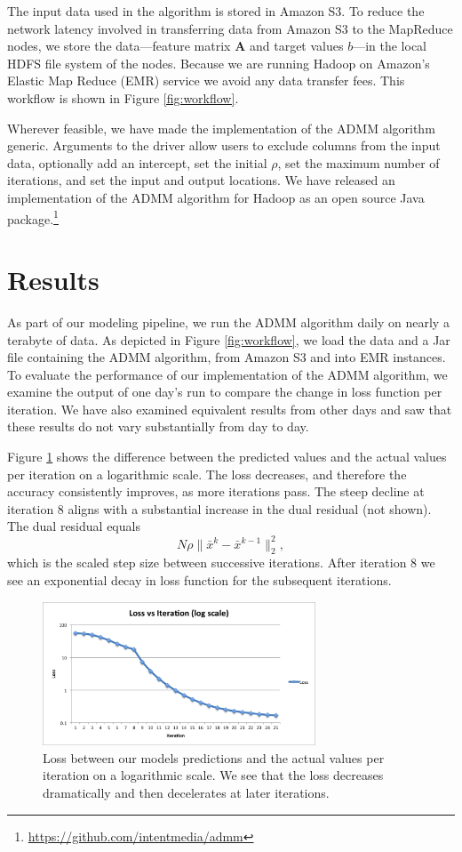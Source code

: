 \documentclass[10pt, conference, compsocconf]{IEEEtran}
\begin{document}
The input data used in the algorithm is stored in Amazon S3.  To reduce the network latency involved in transferring data from Amazon S3 to the MapReduce nodes, we store the data---feature matrix $\mathbf{A}$ and target values $b$---in the local HDFS file system of the nodes.  Because we are running Hadoop on Amazon's Elastic Map Reduce (EMR) service we avoid any data transfer fees.  This workflow is shown in Figure \ref{fig:workflow}.

Wherever feasible, we have made the implementation of the ADMM algorithm generic.  Arguments to the driver allow users to exclude columns from the input data, optionally add an intercept, set the initial $\rho$, set the maximum number of iterations, and set the input and output locations. We have released an implementation of the ADMM algorithm for Hadoop as an open source Java package.\footnote{\url{https://github.com/intentmedia/admm}}

\section{Results}\label{sec:results}
As part of our modeling pipeline, we run the ADMM algorithm daily on nearly a terabyte of data.  As depicted in Figure \ref{fig:workflow}, we load the data and a Jar file containing the ADMM algorithm, from Amazon S3 and into EMR instances.  To evaluate the performance of our implementation of the ADMM algorithm, we examine the output of one day's run to compare the change in loss function per iteration.  We have also examined equivalent results from other days and saw that these results do not vary substantially from day to day.

Figure \ref{fig:iter} shows the difference between the predicted values and the actual values per iteration on a logarithmic scale.  The loss decreases, and therefore the accuracy consistently improves, as more iterations pass.  The steep decline at iteration 8 aligns with a substantial increase in the dual residual (not shown).  The dual residual equals
$$N\rho\|\bar{x}^k-\bar{x}^{k-1}\|^2_2,$$
which is the scaled step size between successive iterations. After iteration 8 we see an exponential decay in loss function for the subsequent iterations.

\begin{figure}[!t]
\centering
\includegraphics[width=3.2in]{iter_rnorm_plot}
\caption{Loss between our models predictions and the actual values per iteration on a logarithmic scale.  We see that the loss decreases dramatically and then decelerates at later iterations.}
\label{fig:iter}
\end{figure}
\end{document}
